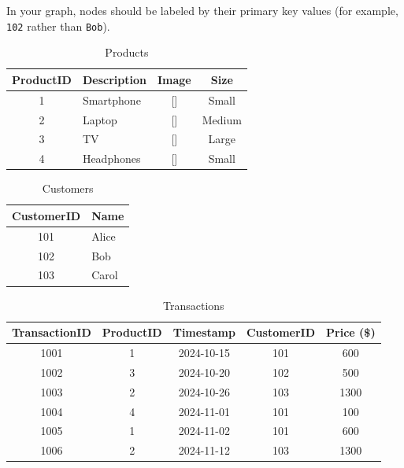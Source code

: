 In your graph, nodes should be labeled by their primary key values (for example, \texttt{102} rather than \texttt{Bob}).

\begin{table}[H]
\centering
\caption{Products}
\vspace{2mm}

\begin{tabular}{|c|l|c|c|}
\hline
\textbf{ProductID} & \textbf{Description} & \textbf{Image} & \textbf{Size} \\
\hline
1 & Smartphone & [] & Small \\
2 & Laptop & [] & Medium \\
3 & TV & [] & Large \\
4 & Headphones & [] & Small \\
\hline
\end{tabular}
\end{table}

\begin{table}[H]
\centering
\caption{Customers}
\vspace{2mm}

\begin{tabular}{|c|l|}
\hline
\textbf{CustomerID} & \textbf{Name} \\
\hline
101 & Alice \\
102 & Bob \\
103 & Carol \\
\hline
\end{tabular}
\end{table}

\begin{table}[H]
\centering
\caption{Transactions}
\vspace{2mm}

\begin{tabular}{|c|c|c|c|c|}
\hline
\textbf{TransactionID} & \textbf{ProductID} & \textbf{Timestamp} & \textbf{CustomerID} & \textbf{Price (\$)} \\
\hline
1001 & 1 & 2024-10-15 & 101 & 600 \\
1002 & 3 & 2024-10-20 & 102 & 500 \\
1003 & 2 & 2024-10-26 & 103 & 1300 \\
1004 & 4 & 2024-11-01 & 101 & 100 \\
1005 & 1 & 2024-11-02 & 101 & 600 \\
1006 & 2 & 2024-11-12 & 103 & 1300 \\
\hline
\end{tabular}
\end{table}

